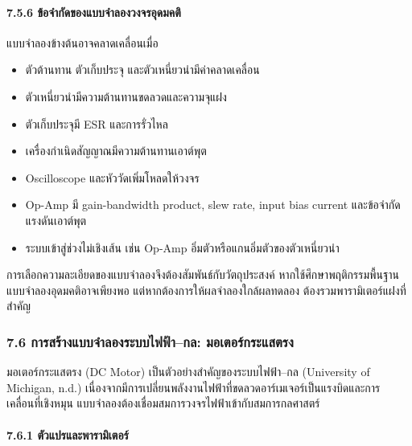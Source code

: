 \paragraph{7.5.6 ข้อจำกัดของแบบจำลองวงจรอุดมคติ}

แบบจำลองข้างต้นอาจคลาดเคลื่อนเมื่อ

\begin{itemize}
    \item ตัวต้านทาน ตัวเก็บประจุ และตัวเหนี่ยวนำมีค่าคลาดเคลื่อน
    \item ตัวเหนี่ยวนำมีความต้านทานขดลวดและความจุแฝง
    \item ตัวเก็บประจุมี ESR และการรั่วไหล
    \item เครื่องกำเนิดสัญญาณมีความต้านทานเอาต์พุต
    \item Oscilloscope และหัววัดเพิ่มโหลดให้วงจร
    \item Op-Amp มี gain-bandwidth product, slew rate, input bias current และข้อจำกัดแรงดันเอาต์พุต
    \item ระบบเข้าสู่ช่วงไม่เชิงเส้น เช่น Op-Amp อิ่มตัวหรือแกนอิ่มตัวของตัวเหนี่ยวนำ
\end{itemize}

การเลือกความละเอียดของแบบจำลองจึงต้องสัมพันธ์กับวัตถุประสงค์ หากใช้ศึกษาพฤติกรรมพื้นฐาน แบบจำลองอุดมคติอาจเพียงพอ แต่หากต้องการให้ผลจำลองใกล้ผลทดลอง ต้องรวมพารามิเตอร์แฝงที่สำคัญ

\subsubsection{7.6 การสร้างแบบจำลองระบบไฟฟ้า–กล: มอเตอร์กระแสตรง}

มอเตอร์กระแสตรง (DC Motor) เป็นตัวอย่างสำคัญของระบบไฟฟ้า–กล (University of Michigan, n.d.) เนื่องจากมีการเปลี่ยนพลังงานไฟฟ้าที่ขดลวดอาร์เมเจอร์เป็นแรงบิดและการเคลื่อนที่เชิงหมุน แบบจำลองต้องเชื่อมสมการวงจรไฟฟ้าเข้ากับสมการกลศาสตร์

\paragraph{7.6.1 ตัวแปรและพารามิเตอร์}


